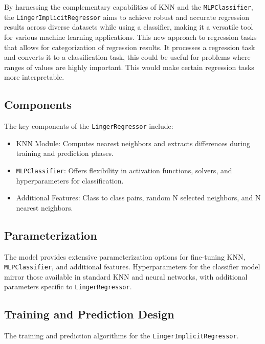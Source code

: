\documentclass[a4paper, 12pt]{report}
\begin{document}
By harnessing the complementary capabilities of KNN and the \texttt{MLPClassifier}, the \texttt{LingerImplicitRegressor}
aims to achieve robust and accurate regression results across diverse datasets while using a classifier, making it a versatile tool for various machine learning applications. 
This new approach to regression tasks that allows for categorization of regression results.
It processes a regression task and converts it to a classification task, this could be useful for problems where ranges of values are highly important. 
This would make certain regression tasks more interpretable.
\subsection{Components}
The key components of the \texttt{LingerRegressor} include:
\begin{itemize}
\item KNN Module: Computes nearest neighbors and extracts differences during training and prediction phases.
\item \texttt{MLPClassifier}: Offers flexibility in activation functions, solvers, and hyperparameters for classification.
\item Additional Features: Class to class pairs, random N selected neighbors, and N nearest neighbors.
\end{itemize}

\subsection{Parameterization}
The model provides extensive parameterization options for fine-tuning KNN, \texttt{MLPClassifier}, and additional features. Hyperparameters for the classifier model mirror those available in standard KNN and neural networks, with additional parameters specific to \texttt{LingerRegressor}.

\subsection{Training and Prediction Design}
The training and prediction algorithms for the \texttt{LingerImplicitRegressor}.
\end{document}
